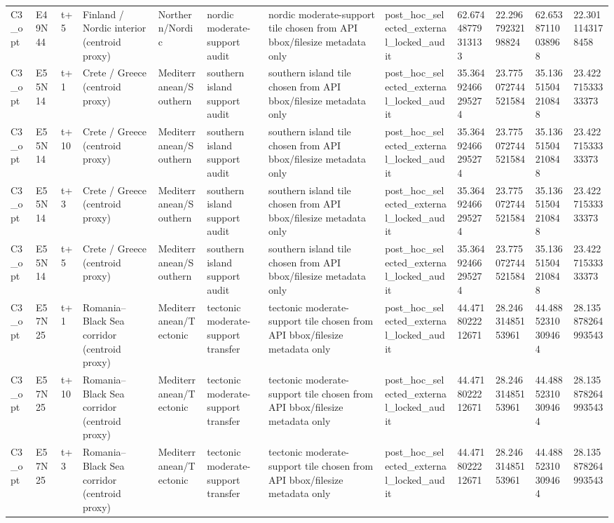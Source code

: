 \begin{landscape}
\begin{longtable}{llllllllllll}
C3\_opt & E49N44 & t+5 & Finland / Nordic interior (centroid proxy) & Northern/Nordic & nordic moderate-support audit & nordic moderate-support tile chosen from API bbox/filesize metadata only & post\_hoc\_selected\_external\_locked\_audit & 62.67448779313133 & 22.29679232198824 & 62.65387110038968 & 22.3011143178458 \\
C3\_opt & E55N14 & t+1 & Crete / Greece (centroid proxy) & Mediterranean/Southern & southern island support audit & southern island tile chosen from API bbox/filesize metadata only & post\_hoc\_selected\_external\_locked\_audit & 35.36492466295274 & 23.775072744521584 & 35.13651504210848 & 23.42271533333373 \\
C3\_opt & E55N14 & t+10 & Crete / Greece (centroid proxy) & Mediterranean/Southern & southern island support audit & southern island tile chosen from API bbox/filesize metadata only & post\_hoc\_selected\_external\_locked\_audit & 35.36492466295274 & 23.775072744521584 & 35.13651504210848 & 23.42271533333373 \\
C3\_opt & E55N14 & t+3 & Crete / Greece (centroid proxy) & Mediterranean/Southern & southern island support audit & southern island tile chosen from API bbox/filesize metadata only & post\_hoc\_selected\_external\_locked\_audit & 35.36492466295274 & 23.775072744521584 & 35.13651504210848 & 23.42271533333373 \\
C3\_opt & E55N14 & t+5 & Crete / Greece (centroid proxy) & Mediterranean/Southern & southern island support audit & southern island tile chosen from API bbox/filesize metadata only & post\_hoc\_selected\_external\_locked\_audit & 35.36492466295274 & 23.775072744521584 & 35.13651504210848 & 23.42271533333373 \\
C3\_opt & E57N25 & t+1 & Romania–Black Sea corridor (centroid proxy) & Mediterranean/Tectonic & tectonic moderate-support transfer & tectonic moderate-support tile chosen from API bbox/filesize metadata only & post\_hoc\_selected\_external\_locked\_audit & 44.4718022212671 & 28.24631485153961 & 44.48852310309464 & 28.135878264993543 \\
C3\_opt & E57N25 & t+10 & Romania–Black Sea corridor (centroid proxy) & Mediterranean/Tectonic & tectonic moderate-support transfer & tectonic moderate-support tile chosen from API bbox/filesize metadata only & post\_hoc\_selected\_external\_locked\_audit & 44.4718022212671 & 28.24631485153961 & 44.48852310309464 & 28.135878264993543 \\
C3\_opt & E57N25 & t+3 & Romania–Black Sea corridor (centroid proxy) & Mediterranean/Tectonic & tectonic moderate-support transfer & tectonic moderate-support tile chosen from API bbox/filesize metadata only & post\_hoc\_selected\_external\_locked\_audit & 44.4718022212671 & 28.24631485153961 & 44.48852310309464 & 28.135878264993543 \\

\end{longtable}
\end{landscape}
